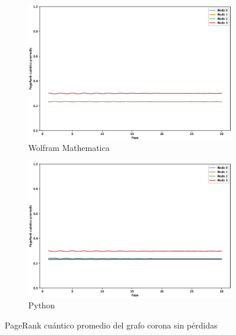 \begin{figure}[H]
    \centering
    \begin{subfigure}[m]{0.45\textwidth}
        \centering
        \includegraphics[width=0.9\linewidth]{img/crown-mean-M.eps}
        \caption{Wolfram Mathematica}
    \end{subfigure}
    \begin{subfigure}[m]{0.45\textwidth}
        \centering
        \includegraphics[width=0.9\linewidth]{img/crown-mean-lossless.eps}
        \caption{Python}
    \end{subfigure}
    \caption[PageRank cuántico promedio del grafo corona sin pérdidas]{PageRank cuántico promedio del grafo corona sin pérdidas}
    \label{fig:meancrownlossless}
\end{figure}

